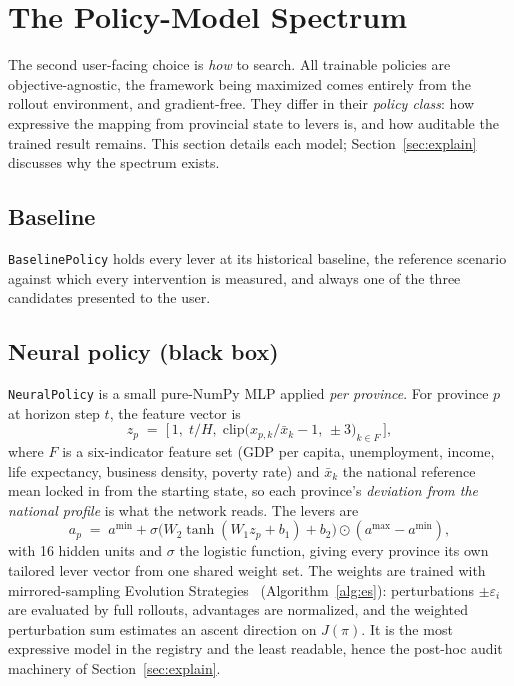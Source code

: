 \documentclass[11pt,a4paper]{article}
\newcommand{\code}[1]{\texttt{#1}}
\begin{document}
\section{The Policy-Model Spectrum}
\label{sec:policymodels}

The second user-facing choice is \emph{how} to search. All trainable policies
are objective-agnostic, the framework being maximized comes entirely from
the rollout environment, and gradient-free. They differ in their
\emph{policy class}: how expressive the mapping from provincial state to
levers is, and how auditable the trained result remains. This section details
each model; Section~\ref{sec:explain} discusses why the spectrum exists.

\subsection{Baseline}

\code{BaselinePolicy} holds every lever at its historical baseline, the
reference scenario against which every intervention is measured, and always
one of the three candidates presented to the user.

\subsection{Neural policy (black box)}

\code{NeuralPolicy} is a small pure-NumPy MLP applied \emph{per province}. For
province $p$ at horizon step $t$, the feature vector is
\begin{equation}
    z_p \;=\; \Big[\, 1,\; t/H,\;
    \mathrm{clip}\big(x_{p,k}/\bar{x}_k - 1,\, \pm 3\big)_{k \in F} \,\Big],
\end{equation}
where $F$ is a six-indicator feature set (GDP per capita, unemployment,
income, life expectancy, business density, poverty rate) and $\bar{x}_k$ the
national reference mean locked in from the starting state, so each
province's \emph{deviation from the national profile} is what the network
reads. The levers are
\begin{equation}
    a_p \;=\; a^{\min} + \sigma\!\big(W_2 \tanh(W_1 z_p + b_1) + b_2\big)
    \odot (a^{\max} - a^{\min}),
\end{equation}
with 16 hidden units and $\sigma$ the logistic function, giving every province
its own tailored lever vector from one shared weight set. The weights are
trained with mirrored-sampling Evolution Strategies~\cite{salimans2017}
(Algorithm~\ref{alg:es}): perturbations $\pm\varepsilon_i$ are evaluated by
full rollouts, advantages are normalized, and the weighted perturbation sum
estimates an ascent direction on $J(\pi)$. It is the most expressive model in
the registry and the least readable, hence the post-hoc audit machinery of
Section~\ref{sec:explain}.
\end{document}
